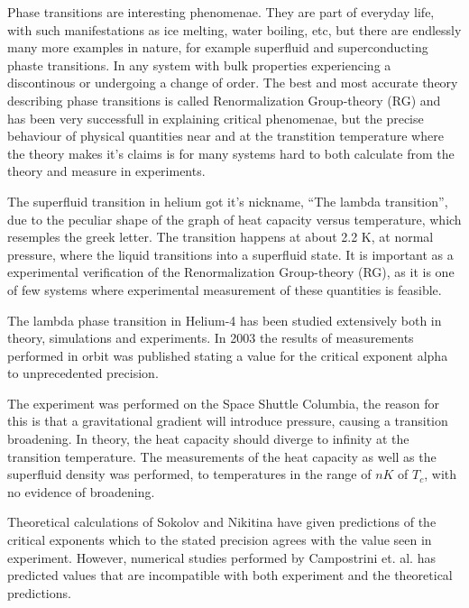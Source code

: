 %

Phase transitions are interesting phenomenae. They are part of everyday life, with such manifestations as ice melting, water boiling, etc, but there are endlessly many more examples in nature, for example superfluid and superconducting phaste transitions. In any system with bulk properties experiencing a discontinous or  undergoing a change of order. The best and most accurate theory describing phase transitions is called Renormalization Group-theory (RG) and has been very successfull in explaining critical phenomenae, but the precise behaviour of physical quantities near and at the transtition temperature where the theory makes it's claims is for many systems hard to both calculate from the theory and measure in experiments.

The superfluid transition in helium got it's nickname, ``The lambda transition'', due to the peculiar shape of the graph of heat capacity versus temperature, which resemples the greek letter. The transition happens at about 2.2 K, at normal pressure, where the liquid transitions into a superfluid state. It is important as a experimental verification of the Renormalization Group-theory (RG), as it is one of few systems where experimental measurement of these quantities is feasible. 

The lambda phase transition in Helium-4 has been studied extensively both in theory, simulations and experiments. In 2003 the results of measurements performed in orbit was published\cite{Lipa2003} stating a value for the critical exponent alpha to unprecedented precision.

The experiment was performed on the Space Shuttle Columbia, the reason for this is that a gravitational gradient will introduce pressure, causing a transition broadening. In theory, the heat capacity should diverge to infinity at the transition temperature.
The measurements of the heat capacity as well as the superfluid density was performed, to temperatures in the range of $nK$ of $T_c$, with no evidence of broadening.

Theoretical calculations of Sokolov and Nikitina \cite{Sokolov2016} have given predictions of the critical exponents which to the stated precision agrees with the value seen in experiment.
However, numerical studies performed by Campostrini et. al. \cite{Campostrini2006} has predicted values that are incompatible with both experiment and the theoretical predictions. 

